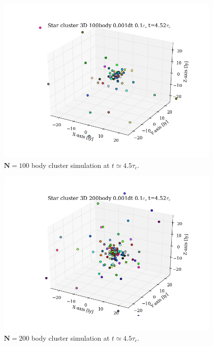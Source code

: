 \documentclass[11pt,a4paper,notitlepage,twocolumn]{article}
\begin{document}
\begin{figure}
[H]\center
\includegraphics[scale=0.35]{../moviefigs/eps10/ClusterPos_100body_dt1_eps10_dur16.png}
\caption{$\mathbf{N} = 100$ body cluster simulation at $t \simeq 4.5\tau_c$.}\label{fig:N100eps10eq}
\end{figure}
\begin{figure}
[H]\center
\includegraphics[scale=0.35]{../moviefigs/eps10/ClusterPos_200body_dt1_eps10_dur16.png}
\caption{$\mathbf{N} = 200$ body cluster simulation at $t \simeq 4.5\tau_c$.}\label{fig:N200eps10eq}
\end{figure}
\end{document}
